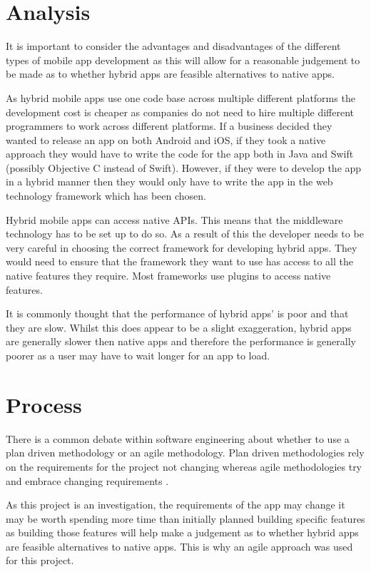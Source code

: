 \section{Analysis}
It is important to consider the advantages and disadvantages of the different types of mobile app development as this will allow for a reasonable judgement to be made as to whether hybrid apps are feasible alternatives to native apps.

As hybrid mobile apps use one code base across multiple different platforms the development cost is cheaper as companies do not need to hire multiple different programmers to work across different platforms. If a business decided they wanted to release an app on both Android and iOS, if they took a native approach they would have to write the code for the app both in Java and Swift (possibly Objective C instead of Swift). However, if they were to develop the app in a hybrid manner then they would only have to write the app in the web technology framework which has been chosen.

Hybrid mobile apps can access native APIs. This means that the middleware technology has to be set up to do so. As a result of this the developer needs to be very careful in choosing the correct framework for developing hybrid apps. They would need to ensure that the framework they want to use has access to all the native features they require. Most frameworks use plugins to access native features.

It is commonly thought that the performance of hybrid apps' is poor and that they are slow. Whilst this does appear to be a slight exaggeration, hybrid apps are generally slower then native apps and therefore the performance is generally poorer as a user may have to wait longer for an app to load.


\section{Process}
There is a common debate within software engineering about whether to use a plan driven methodology or an agile methodology. Plan driven methodologies rely on the requirements for the project not changing whereas agile methodologies try and embrace changing requirements \cite{Agile}.

As this project is an investigation, the requirements of the app may change it may be worth spending more time than initially planned building specific features as building those features will help make a judgement as to whether hybrid apps are feasible alternatives to native apps. This is why an agile approach was used for this project.

